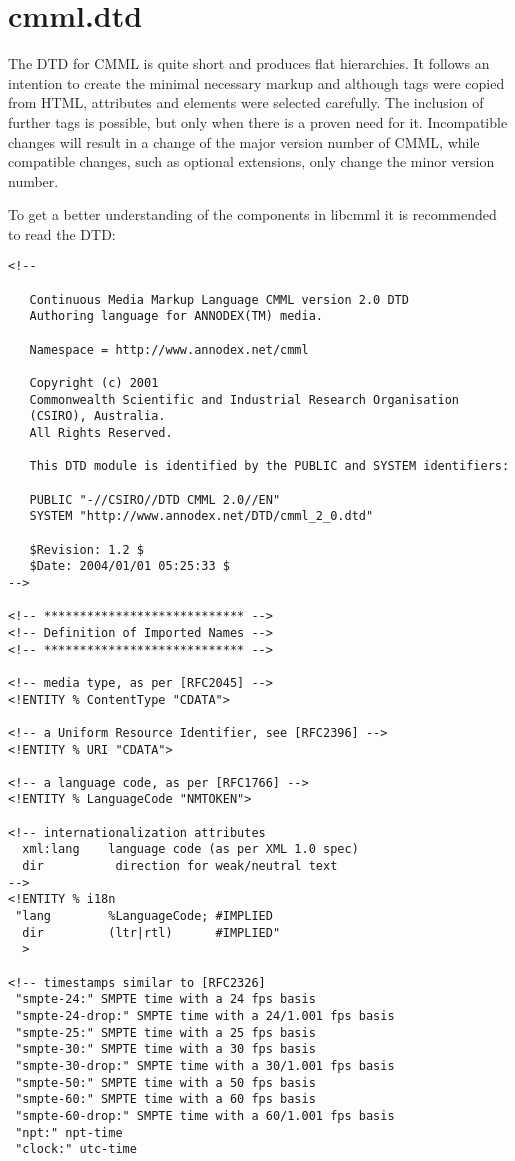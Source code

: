 \section{cmml.dtd}
The DTD for CMML is quite short and produces flat hierarchies. It follows an intention to create the minimal necessary markup and although tags were copied from HTML, attributes and elements were selected carefully. The inclusion of further tags is possible, but only when there is a proven need for it. Incompatible changes will result in a change of the major version number of CMML, while compatible changes, such as optional extensions, only change the minor version number.

To get a better understanding of the components in libcmml it is recommended to read the DTD: 

\footnotesize\begin{verbatim}<!--

   Continuous Media Markup Language CMML version 2.0 DTD
   Authoring language for ANNODEX(TM) media.

   Namespace = http://www.annodex.net/cmml

   Copyright (c) 2001 
   Commonwealth Scientific and Industrial Research Organisation
   (CSIRO), Australia.
   All Rights Reserved. 

   This DTD module is identified by the PUBLIC and SYSTEM identifiers:

   PUBLIC "-//CSIRO//DTD CMML 2.0//EN"
   SYSTEM "http://www.annodex.net/DTD/cmml_2_0.dtd"

   $Revision: 1.2 $
   $Date: 2004/01/01 05:25:33 $
-->

<!-- **************************** -->
<!-- Definition of Imported Names -->
<!-- **************************** -->

<!-- media type, as per [RFC2045] -->
<!ENTITY % ContentType "CDATA">
 
<!-- a Uniform Resource Identifier, see [RFC2396] -->
<!ENTITY % URI "CDATA">

<!-- a language code, as per [RFC1766] -->
<!ENTITY % LanguageCode "NMTOKEN">

<!-- internationalization attributes
  xml:lang    language code (as per XML 1.0 spec)
  dir          direction for weak/neutral text
-->
<!ENTITY % i18n
 "lang        %LanguageCode; #IMPLIED
  dir         (ltr|rtl)      #IMPLIED"
  >

<!-- timestamps similar to [RFC2326] 
 "smpte-24:" SMPTE time with a 24 fps basis
 "smpte-24-drop:" SMPTE time with a 24/1.001 fps basis
 "smpte-25:" SMPTE time with a 25 fps basis
 "smpte-30:" SMPTE time with a 30 fps basis
 "smpte-30-drop:" SMPTE time with a 30/1.001 fps basis
 "smpte-50:" SMPTE time with a 50 fps basis
 "smpte-60:" SMPTE time with a 60 fps basis
 "smpte-60-drop:" SMPTE time with a 60/1.001 fps basis
 "npt:" npt-time
 "clock:" utc-time


\end{verbatim}
